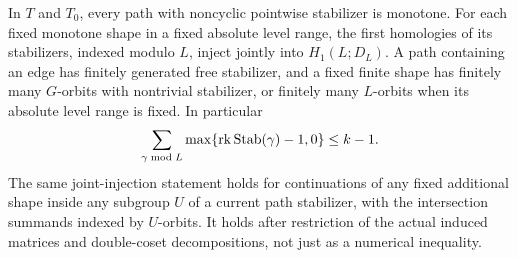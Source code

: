\begin{proposition}\label{row:path-inertia}
In \(T\) and \(T_0\), every path with noncyclic pointwise stabilizer
is monotone. For each fixed monotone shape in a fixed absolute level
range, the first homologies of
its stabilizers, indexed modulo \(L\), inject jointly into
\(H_1(L;D_L)\). A path containing an edge has finitely generated free
stabilizer, and a fixed finite shape has finitely many \(G\)-orbits
with nontrivial stabilizer, or finitely many \(L\)-orbits when its
absolute level range is fixed. In particular
\begin{equation}\label{row:rank-budget}
 \sum_{\gamma\bmod L}\max\{\operatorname{rk}\operatorname{Stab}(\gamma)-1,0\}\leq k-1.
\end{equation}
The same joint-injection statement holds for continuations of any
fixed additional shape inside any subgroup \(U\) of a current path
stabilizer, with the intersection summands indexed by \(U\)-orbits.
It holds after restriction of the actual induced matrices and
double-coset decompositions, not just as a numerical inequality.
\end{proposition}

